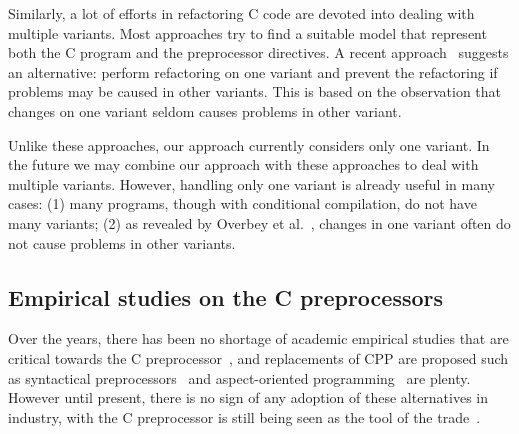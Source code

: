 Similarly, a lot of efforts in refactoring C code are devoted into
dealing with multiple variants. Most approaches
\cite{Garrido2002,Vittek2003,Spinellis2003,Garrido2013} try to find a
suitable model that represent both the C program and the preprocessor
directives. A recent approach~\cite{Overbey2014} suggests an
alternative: perform refactoring on one variant and prevent the
refactoring if problems may be caused in other variants. This is based
on the observation that changes on one variant seldom causes problems
in other variant.

Unlike these approaches, our approach currently considers only one
variant. In the future we may combine our approach with these
approaches to deal with multiple variants. However, handling only one
variant is already useful in many cases: (1) many programs, though
with conditional compilation, do not have many variants; (2) as
revealed by Overbey et al.~\cite{Overbey2014}, changes in one variant
often do not cause problems in other variants.%




%
%

\subsection{Empirical studies on the C preprocessors}
Over the years, there has been no shortage of academic empirical
studies that are critical towards the C
preprocessor~\cite{Spencer92,ernst2002empirical,Liebig2011}, and
replacements of CPP are proposed such as syntactical preprocessors~\cite{Weise1993,McCloskey:2005} and aspect-oriented programming~\cite{Lohmann2006,Adams2009,Boucher2010} are plenty. However until present, there is no sign of any adoption of these alternatives in industry, with the C preprocessor is still being seen as the tool of the trade~\cite{Medeiros2015}. 


